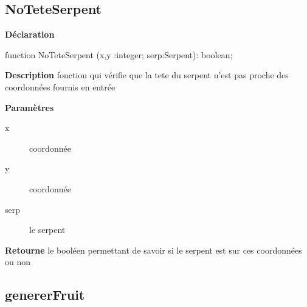 \documentclass{report}
\newif\ifpdf
\begin{document}
\subsection*{NoTeteSerpent}
\fi
\label{Generation-NoTeteSerpent}
\begin{list}{}{
\setlength{\itemindent}{0cm}
\setlength{\listparindent}{0cm}
\setlength{\leftmargin}{\evensidemargin}
\addtolength{\leftmargin}{\tmplength}
\settowidth{\labelsep}{X}
\addtolength{\leftmargin}{\labelsep}
\setlength{\labelwidth}{\tmplength}
}
\item[\textbf{Déclaration}\hfill]
\ifpdf
\begin{flushleft}
\fi
\begin{ttfamily}
function NoTeteSerpent (x,y :integer; serp:Serpent): boolean;\end{ttfamily}

\ifpdf
\end{flushleft}
\fi

\par
\item[\textbf{Description}]
fonction qui vérifie que la tete du serpent n'est pas proche des coordonnées fournis en entrée    \par
\item[\textbf{Paramètres}]
\begin{description}
\item[x] coordonnée
\item[y] coordonnée
\item[serp] le serpent
\end{description}
\item[\textbf{Retourne}]le booléen permettant de savoir si le serpent est sur ces coordonnées ou non


\end{list}
\ifpdf
\subsection*{\large{\textbf{genererFruit}}\normalsize\hspace{1ex}\hrulefill}
\else
\end{document}

